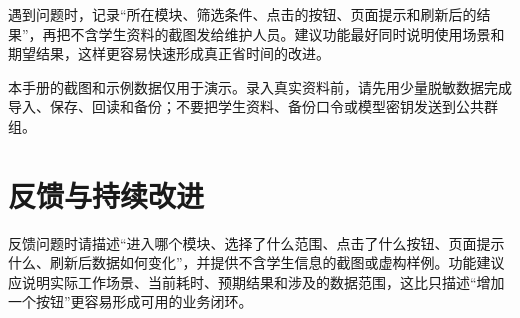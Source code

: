 \documentclass[UTF8,zihao=-4,oneside]{ctexrep}
\begin{document}
遇到问题时，记录“所在模块、筛选条件、点击的按钮、页面提示和刷新后的结果”，再把不含学生资料的截图发给维护人员。建议功能最好同时说明使用场景和期望结果，这样更容易快速形成真正省时间的改进。

\begin{warningbox}
本手册的截图和示例数据仅用于演示。录入真实资料前，请先用少量脱敏数据完成导入、保存、回读和备份；不要把学生资料、备份口令或模型密钥发送到公共群组。
\end{warningbox}

\section{反馈与持续改进}

反馈问题时请描述“进入哪个模块、选择了什么范围、点击了什么按钮、页面提示什么、刷新后数据如何变化”，并提供不含学生信息的截图或虚构样例。功能建议应说明实际工作场景、当前耗时、预期结果和涉及的数据范围，这比只描述“增加一个按钮”更容易形成可用的业务闭环。
\end{document}
